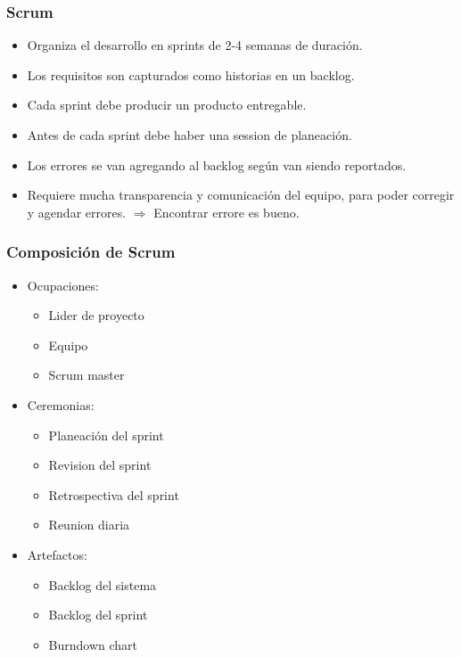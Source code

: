\documentclass{beamer}
\begin{document}
\begin{frame}
    \frametitle{Scrum}
    \begin{itemize}
        \item{Organiza el desarrollo en sprints de 2-4 semanas de duraci\'on.}
        \item{Los requisitos son capturados como historias en un backlog.}
        \item{Cada sprint debe producir un producto entregable.}
        \item{Antes de cada sprint debe haber una session de planeaci\'on.}
        \item{Los errores se van agregando al backlog seg\'un van siendo reportados.}
        \item{Requiere mucha transparencia y comunicaci\'on del equipo,
        para poder corregir y agendar errores. $\Rightarrow$ Encontrar errore es bueno.}
    \end{itemize}
\end{frame}

\begin{frame}
    \frametitle{Composici\'on de Scrum}
    \begin{itemize}
        \item{Ocupaciones:
            \begin{itemize}
                \item{Lider de proyecto}
                \item{Equipo}
                \item{Scrum master}
            \end{itemize}
        }
        \item{Ceremonias:
            \begin{itemize}
                \item{Planeaci\'on del sprint}
                \item{Revision del sprint}
                \item{Retrospectiva del sprint}
                \item{Reunion diaria}
            \end{itemize}
        }
        \item{Artefactos:
            \begin{itemize}
                \item{Backlog del sistema}
                \item{Backlog del sprint}
                \item{Burndown chart}
            \end{itemize}
        }
    \end{itemize}
\end{frame}
\end{document}

